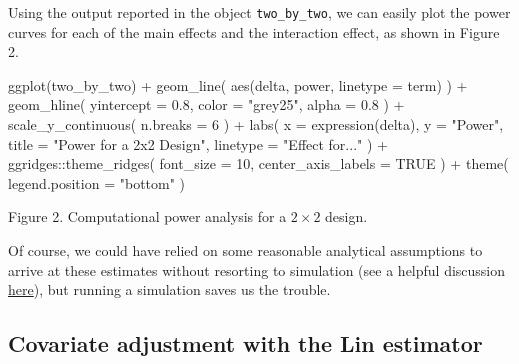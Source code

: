 \documentclass[
  12pt,
]{book}
\newenvironment{Shaded}{\begin{snugshade}}{\end{snugshade}}
\newcommand{\AttributeTok}[1]{\textcolor[rgb]{0.77,0.63,0.00}{#1}}
\newcommand{\ConstantTok}[1]{\textcolor[rgb]{0.00,0.00,0.00}{#1}}
\newcommand{\DecValTok}[1]{\textcolor[rgb]{0.00,0.00,0.81}{#1}}
\newcommand{\FloatTok}[1]{\textcolor[rgb]{0.00,0.00,0.81}{#1}}
\newcommand{\FunctionTok}[1]{\textcolor[rgb]{0.00,0.00,0.00}{#1}}
\newcommand{\NormalTok}[1]{#1}
\newcommand{\SpecialCharTok}[1]{\textcolor[rgb]{0.00,0.00,0.00}{#1}}
\newcommand{\StringTok}[1]{\textcolor[rgb]{0.31,0.60,0.02}{#1}}
\theoremstyle{definition}
\theoremstyle{definition}
\theoremstyle{definition}
\theoremstyle{remark}
\begin{document}
Using the output reported in the object \texttt{two\_by\_two}, we can
easily plot the power curves for each of the main effects and the
interaction effect, as shown in Figure 2.

\begin{Shaded}
\begin{Highlighting}[]
\FunctionTok{ggplot}\NormalTok{(two\_by\_two) }\SpecialCharTok{+}
  \FunctionTok{geom\_line}\NormalTok{(}
    \FunctionTok{aes}\NormalTok{(delta, power, }\AttributeTok{linetype =}\NormalTok{ term)}
\NormalTok{  ) }\SpecialCharTok{+}
  \FunctionTok{geom\_hline}\NormalTok{(}
    \AttributeTok{yintercept =} \FloatTok{0.8}\NormalTok{,}
    \AttributeTok{color =} \StringTok{"grey25"}\NormalTok{,}
    \AttributeTok{alpha =} \FloatTok{0.8}
\NormalTok{  ) }\SpecialCharTok{+}
  \FunctionTok{scale\_y\_continuous}\NormalTok{(}
    \AttributeTok{n.breaks =} \DecValTok{6}
\NormalTok{  ) }\SpecialCharTok{+}
  \FunctionTok{labs}\NormalTok{(}
    \AttributeTok{x =} \FunctionTok{expression}\NormalTok{(delta),}
    \AttributeTok{y =} \StringTok{"Power"}\NormalTok{,}
    \AttributeTok{title =} \StringTok{"Power for a 2x2 Design"}\NormalTok{,}
    \AttributeTok{linetype =} \StringTok{"Effect for..."}
\NormalTok{  ) }\SpecialCharTok{+}
\NormalTok{  ggridges}\SpecialCharTok{::}\FunctionTok{theme\_ridges}\NormalTok{(}
    \AttributeTok{font\_size =} \DecValTok{10}\NormalTok{,}
    \AttributeTok{center\_axis\_labels =} \ConstantTok{TRUE}
\NormalTok{  ) }\SpecialCharTok{+}
  \FunctionTok{theme}\NormalTok{(}
    \AttributeTok{legend.position =} \StringTok{"bottom"}
\NormalTok{  )}
\end{Highlighting}
\end{Shaded}

Figure 2. Computational power analysis for a \(2\times 2\) design.

Of course, we could have relied on some reasonable analytical
assumptions to arrive at these estimates without resorting to simulation
(see a helpful discussion
\href{https://statmodeling.stat.columbia.edu/2018/03/15/need-16-times-sample-size-estimate-interaction-estimate-main-effect/}{here}),
but running a simulation saves us the trouble.

\hypertarget{covariate-adjustment-with-the-lin-estimator}{%
\subsection{Covariate adjustment with the Lin
estimator}\label{covariate-adjustment-with-the-lin-estimator}}
\end{document}
